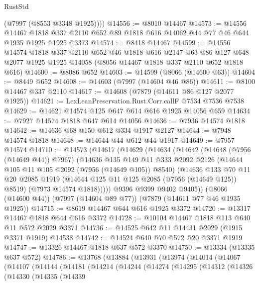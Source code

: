 \begin{lexlean}{RustStd}
\begin{coremodule}
        (@7997 (@8553 @3348 @1925))))
@14556 := @8010 @14467
@14573 := @14556
    @14467
    @1818
    @337
    @2110
    @652
    @89
    @1818
    @616
    @14062
    @44
    @77
    @46
    @644
    @1935
    @1925
    @1925
    @3373
@14574 := @8418 @14467
@14599 := @14556
    @14574
    @1818
    @337
    @2110
    @652
    @46
    @1818
    @616
    @2147
    @63
    @86
    @127
    @648
    @2077
    @1925
    @1925
    @14058
    (@8056 @14467 @1818 @337 @2110 @652 @1818 @616)
@14600 := @8086 @652
@14603 := @14599 (@8066 (@14600 @63))
@14604 := @8449 @652
@14608 := @14603 (@7997 (@14604 @46 @86))
@14611 := @8100 @14467 @337 @2110
@14617 := @14608 (@7879 (@14611 @86 @127 @2077 @1925))
@14621 := LexLeanPreservation.Rust.Corr.callF @7534 @7536 @7538
@14629 := @14621 @14574 @125 @647 @614 @616 @1925 @14056 @659
@14634 := @7927 @14574 @1818 @647 @614 @14056
@14636 := @7936 @14574 @1818
@14642 := @14636 @68 @150 @612 @334 @1917 @2127
@14644 := @7948 @14574 @1818
@14648 := @14644 @44 @612 @44 @1917
@14649 := @7957 @14574
@14710 := @14573
    (@14617
      (@14629
        (@14634
          (@14642
            (@14648 (@7956 (@14649 @44)) @7967)
            (@14636
              @135
              @149
              @11
              @333
              @2092
              @2126
              (@14644 @105 @11 @105 @2092 (@7956 (@14649 @105)) @8540)
              (@14636
                @133
                @70
                @11
                @20
                @2085
                @1919
                (@14644 @125 @11 @125 @2085 (@7956 (@14649 @125)) @8519)
                (@7973 @14574 @1818)))))
        @9396
        @9399
        @9402
        @9405))
    (@8066 (@14600 @44))
    (@7997 (@14604 @89 @77))
    (@7879 (@14611 @77 @46 @1935 @1925))
@14715 := @8619 @14467 @644 @616 @1925 @3372
@14720 := @13317 @14467 @1818 @644 @616 @3372
@14728 := @10104 @14467 @1818 @113 @640 @11 @572 @2029 @3371
@14736 := @14525 @642 @11 @14431 @2029 (@1915 @3371 @1919) @14538
@14742 := @14524 @640 @70 @572 @20 @3371 @1919
@14747 := @13326 @14467 @1818 @637 @572 @3370
@14750 := @13334 (@13335 @637 @572)
@14786 := @13768
    (@13884
      (@13931
        (@13974
          (@14014
            (@14067
              (@14107
                (@14144
                  (@14181
                    (@14214
                      (@14244
                        (@14274
                          (@14295
                            (@14312
                              (@14326
                                (@14330
                                  (@14335
                                    (@14339

\end{coremodule}
\end{lexlean}
